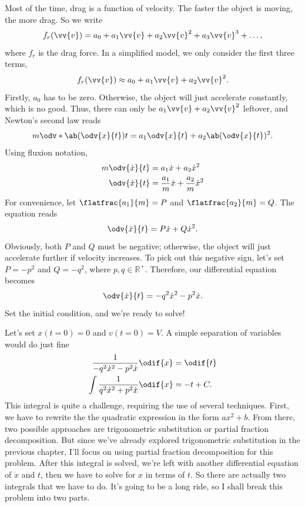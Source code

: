 Most of the time, drag is a function of velocity. The faster the object is moving, the more drag. So we write
\begin{equation}
	f_r(\vv{v}) = a_0 + a_1\vv{v} + a_2\vv{v}^2 + a_3\vv{v}^3 + \dots,
\end{equation}
where $f_r$ is the drag force. In a simplified model, we only consider the first three terms,
\begin{equation}
	f_r(\vv{v}) \approx a_0 + a_1\vv{v} + a_2\vv{v}^2.
\end{equation}
Firstly, $a_0$ has to be zero. Otherwise, the object will just accelerate constantly, which is no good. Thus, there can only be $a_1\vv{v} + a_2\vv{v}^2$ leftover, and Newton's second law reads
\begin{equation*}
	m\odv*{\ab(\odv{x}{t})}{t} = a_1\odv{x}{t} + a_2\ab(\odv{x}{t})^2.
\end{equation*}
Using fluxion notation,
\begin{align*}
	m\odv{\dot{x}}{t} & = a_1\dot{x} + a_2\dot{x}^2                     \\
	\odv{\dot{x}}{t}  & = \frac{a_1}{m}\dot{x} + \frac{a_2}{m}\dot{x}^2
\end{align*}
For convenience, let $\flatfrac{a_1}{m} = P$ and $\flatfrac{a_2}{m} = Q$. The equation reads
\begin{equation}
	\odv{\dot{x}}{t} = P\dot{x} + Q\dot{x}^2.
\end{equation}
Obviously, both $P$ and $Q$ must be negative; otherwise, the object will just accelerate further if velocity increases. To pick out this negative sign, let's set $P = -p^2$ and $Q = -q^2$, where $p, q \in \mathbb{R}^+$. Therefore, our differential equation becomes
\begin{equation}
	\odv{\dot{x}}{t} = - q^2\dot{x}^2 - p^2\dot{x}. \label{eq:drag-equation}
\end{equation}
Set the initial condition, and we're ready to solve!

Let's set $x(t = 0) = 0$ and $v(t = 0) = V$. A simple separation of variables would do just fine
\begin{align}
	\frac{1}{-q^2\dot{x}^2 - p^2\dot{x}}\odif{x}    & = \odif{t}                            \\
	\int\frac{1}{q^2\dot{x}^2 + p^2\dot{x}}\odif{x} & = - t + C. \label{eq:drag-integral-1}
\end{align}
This integral is quite a challenge, requiring the use of several techniques. First, we have to rewrite the the quadratic expression in the form $ax^2 + b$. From there, two possible approaches are trigonometric substitution or partial fraction decomposition. But since we've already explored trigonometric substitution in the previous chapter, I’ll focus on using partial fraction decomposition for this problem. After this integral is solved, we're left with another differential equation of $\dot{x}$ and $t$, then we have to solve for $x$ in terms of $t$. So there are actually two integrals that we have to do. It's going to be a long ride, so I shall break this problem into two parts.

